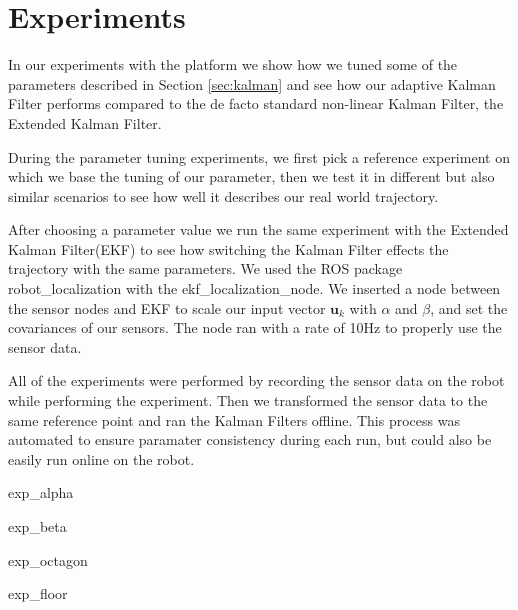 \documentclass[class=report, crop=false]{standalone}
\begin{document}
\chapter{Experiments}

In our experiments with the platform we show how we tuned some of the parameters described in Section \ref{sec:kalman} and see how our adaptive Kalman Filter performs compared to the de facto standard non-linear Kalman Filter, the Extended Kalman Filter.

During the parameter tuning experiments, we first pick a reference experiment on which we base the tuning of our parameter, then we test it in different but also similar scenarios to see how well it describes our real world trajectory.

After choosing a parameter value we run the same experiment with the Extended Kalman Filter(EKF) to see how switching the Kalman Filter effects the trajectory with the same parameters. We used the ROS package robot\_localization with the ekf\_localization\_node. We inserted a node between the sensor nodes and EKF to scale our input vector $\textbf{u}_k$ with $\alpha$ and $\beta$, and set the covariances of our sensors. The node ran with a rate of 10Hz to properly use the sensor data.

All of the experiments were performed by recording the sensor data on the robot while performing the experiment. Then we transformed the sensor data to the same reference point and ran the Kalman Filters offline. This process was automated to ensure paramater consistency during each run, but could also be easily run online on the robot.

{exp_alpha}

{exp_beta}

{exp_octagon}

{exp_floor}
\end{document}
